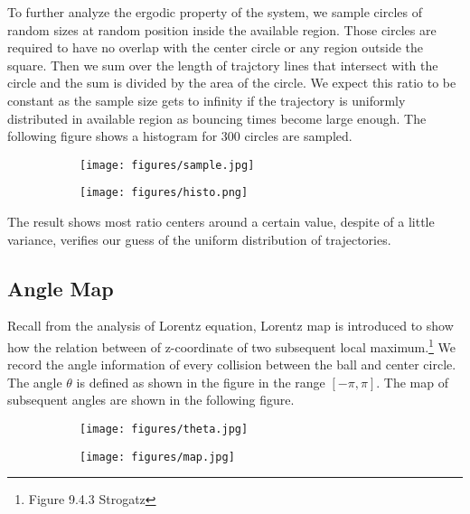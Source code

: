 \documentclass[12pt]{article}
\begin{document}
To further analyze the ergodic property of the system, we sample circles of random sizes at random position inside the available region. Those circles are required to have no overlap with the center circle or any region outside the square. Then we sum over the length of trajctory lines that intersect with the circle and the sum is divided by the area of the circle. We expect this ratio to be constant as the sample size gets to infinity if the trajectory is uniformly distributed in available region as bouncing times become large enough. The following figure shows a histogram for 300 circles are sampled.

\begin{figure}[H] 
  \begin{subfigure}[b]{0.4\textwidth}
    \texttt{[image: figures/sample.jpg]}
    \caption{}
  \end{subfigure}
  \hfill
  \begin{subfigure}[b]{0.55\textwidth}
    \texttt{[image: figures/histo.png]}
    \caption{}
  \end{subfigure}
\end{figure}

The result shows most ratio centers around a certain value, despite of a little variance, verifies our guess of the uniform distribution of trajectories.


\subsection*{Angle Map}

Recall from the analysis of Lorentz equation, Lorentz map is introduced to show how the relation between of z-coordinate of two subsequent local maximum.\footnote{Figure 9.4.3 Strogatz} We record the angle information of every collision between the ball and  center circle. The angle $\theta$ is defined as shown in the figure in the range $[-\pi, \pi]$. The map of subsequent angles are shown in the following figure.

\begin{figure}[H] 
  \begin{subfigure}[b]{0.4\textwidth}
    \texttt{[image: figures/theta.jpg]}
    \caption{}
  \end{subfigure}
  \hfill
  \begin{subfigure}[b]{0.5\textwidth}
    \texttt{[image: figures/map.jpg]}
    \caption{}
  \end{subfigure}
\end{figure}
\end{document}
